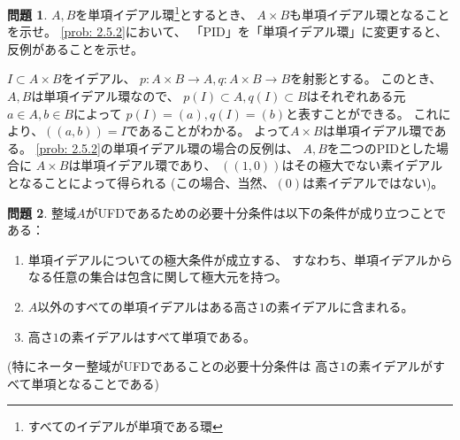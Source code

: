 \documentclass[uplatex]{jsarticle}
\makeatletter
\theoremstyle{definition}
\newtheorem{prob}[prob]{問題}
\renewenvironment{proof}[1][\proofname]{
  \pushQED{\qed}%
  \normalfont \topsep6\p@\@plus6\p@\relax
  \trivlist
  \item[\hskip\labelsep
    #1\@addpunct{\textbf{.}}]\ignorespaces
}{%
  \popQED\endtrivlist\@endpefalse
}
\providecommand{\proofname}{証明}
\makeatother
\begin{document}
\begin{prob}\label{prob: 2.5.3}
  \(A,B\)を単項イデアル環\footnote{すべてのイデアルが単項である環}とするとき、
  \(A\times B\)も単項イデアル環となることを示せ。
  \autoref{prob: 2.5.2}において、
  「PID」を「単項イデアル環」に変更すると、反例があることを示せ。　
\end{prob}

\begin{proof}
  \(I\subset A\times B\)をイデアル、
  \(p:A\times B\to A, q:A\times B \to B\)を射影とする。
  このとき、\(A,B\)は単項イデアル環なので、
  \(p(I)\subset A, q(I)\subset B\)はそれぞれある元\(a\in A,b\in B\)によって
  \(p(I) = (a), q(I) = (b)\)と表すことができる。
  これにより、\(((a,b)) = I\)であることがわかる。
  よって\(A\times B\)は単項イデアル環である。
  \autoref{prob: 2.5.2}の単項イデアル環の場合の反例は、
  \(A,B\)を二つのPIDとした場合に
  \(A\times B\)は単項イデアル環であり、
  \(((1,0))\)はその極大でない素イデアルとなることによって得られる
  (この場合、当然、\((0)\)は素イデアルではない)。
\end{proof}




\begin{prob}\label{prob: 2.5.4}
  整域\(A\)がUFDであるための必要十分条件は以下の条件が成り立つことである：
  \begin{enumerate}
    \item \label{enumi: 2.5.4.1}
    単項イデアルについての極大条件が成立する、
    すなわち、単項イデアルからなる任意の集合は包含に関して極大元を持つ。
    \item \label{enumi: 2.5.4.2}
    \(A\)以外のすべての単項イデアルはある高さ\(1\)の素イデアルに含まれる。
    \item \label{enumi: 2.5.4.3}
    高さ\(1\)の素イデアルはすべて単項である。
  \end{enumerate}
  (特にネーター整域がUFDであることの必要十分条件は
  高さ\(1\)の素イデアルがすべて単項となることである)
\end{prob}
\end{document}
